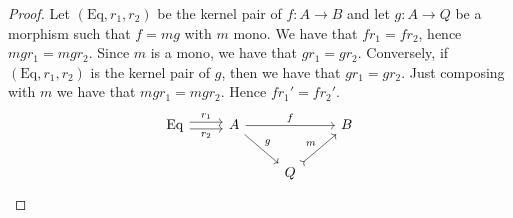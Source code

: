 \begin{subbox}{}
    \begin{proof}
        Let $(\mathrm{Eq},r_1,r_2)$ be the kernel pair of $f: A \to B$ and let $g:A \to Q$ be a morphism such that $f=mg$ with $m$ mono. We have that $fr_1=fr_2$, hence $mgr_1=mgr_2$. Since $m$ is a mono, we have that $gr_1=gr_2$. Conversely, if $(\mathrm{Eq},r_1,r_2)$ is the kernel pair of $g$, then we have that $gr_1=gr_2$. Just composing with $m$ we have that $mgr_1=mgr_2$. Hence $fr_1'=fr_2'$.
        \[
\begin{tikzcd}
\mathrm{Eq} \arrow[r, "r_1", shift left] \arrow[r, "r_2"', shift right] & A \arrow[rr, "f"] \arrow[rd, "g"] &                         & B \\
                                                                        &                                   & Q \arrow[ru, "m", tail] &  
\end{tikzcd}
    \]


\end{proof}
\end{subbox}
